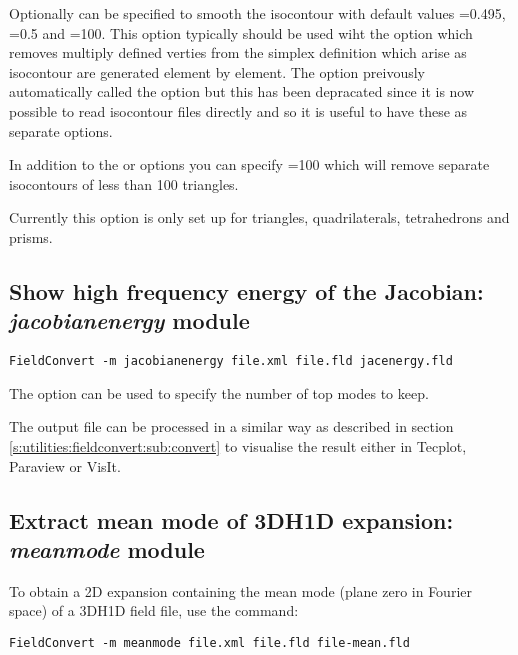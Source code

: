 Optionally  can be specified to smooth the isocontour
with default values =0.495,
=0.5 and =100. This option
typically should be used wiht the  option which
removes multiply defined verties from the simplex definition which
arise as isocontour are generated element by element. The
 option preivously automatically called the
 option but this has been depracated since it is
now possible to read isocontour files directly and so it is useful to
have these as separate options.

In addition to the  or  options
you can specify =100 which will remove
separate isocontours of less than 100 triangles. 

\begin{notebox}
Currently this option is only set up for triangles, quadrilaterals,
 tetrahedrons and prisms.
\end{notebox}
%
%
%
%

\subsection{Show high frequency energy of the Jacobian: \textit{jacobianenergy} module}

\begin{lstlisting}[style=BashInputStyle]
FieldConvert -m jacobianenergy file.xml file.fld jacenergy.fld
\end{lstlisting}

The option  can be used to specify the number of top modes to
keep.

The output file  can be processed in a similar
way as described in section \ref{s:utilities:fieldconvert:sub:convert}
to visualise the result either in Tecplot, Paraview or VisIt. 

%
%
%

\subsection{Extract mean mode of 3DH1D expansion: \textit{meanmode} module}

To obtain a 2D expansion containing the mean mode (plane zero in Fourier space) of a
3DH1D field file, use the command:
\begin{lstlisting}[style=BashInputStyle] 
FieldConvert -m meanmode file.xml file.fld file-mean.fld
\end{lstlisting}

